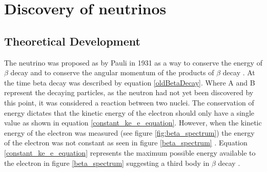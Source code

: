\section{Discovery of neutrinos}
\subsection{Theoretical Development}
The neutrino was proposed as by Pauli in 1931 as a way to conserve the energy of $\beta$ decay and to conserve the angular momentum of the products of $\beta$ decay  \cite{griffiths2008book}\cite{griffiths2008neutrino1.5}\cite{lederman1970resource}. At the time beta decay was described by equation \ref{oldBetaDecay}. Where A and B represent the decaying particles, as the neutron had not yet been discovered by this point, it was considered a reaction between two nuclei. The conservation of energy dictates that the kinetic energy of the electron should only have a single value as shown in equation \ref{constant_ke_e_equation}. However, when the kinetic energy of the electron was measured (see figure \ref{fig:beta_spectrum}) the energy of the electron was not constant as seen in figure \ref{beta_spectrum} \cite{griffiths2008book} \cite{griffiths2008neutrino1.5} \cite{lewis1970neutrinos}. Equation \ref{constant_ke_e_equation} represents the maximum possible energy available to the electron in figure \ref{beta_spectrum} suggesting a third body in $\beta$ decay \cite{griffiths2008book} \cite{griffiths2008neutrino1.5}.


